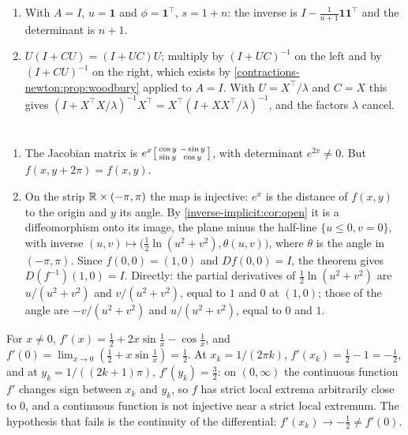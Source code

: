 \begin{enumerate}[nosep]
  \item With $A = I$, $u = \mathbf 1$ and $\phi = \mathbf 1^\top$,
        $s = 1 + n$: the inverse is
        $I - \frac1{n + 1}\mathbf 1\mathbf 1^\top$ and the determinant
        is $n + 1$.
  \item $U(I + CU) = (I + UC)U$; multiply by $(I + UC)^{-1}$ on the
        left and by $(I + CU)^{-1}$ on the right, which exists by
        \cref{contractions-newton:prop:woodbury} applied to $A = I$.
        With $U = X^\top/\lambda$ and $C = X$ this gives
        $(I + X^\top X/\lambda)^{-1}X^\top
        = X^\top(I + XX^\top/\lambda)^{-1}$, and the factors $\lambda$
        cancel.
\end{enumerate}

\section{}

\begin{enumerate}[nosep]
  \item The Jacobian matrix is
        $e^x\begin{bsmallmatrix}\cos y & -\sin y\\\sin y & \cos y
        \end{bsmallmatrix}$, with determinant $e^{2x}\neq0$. But
        $f(x, y + 2\pi) = f(x, y)$.
  \item On the strip $\mathbb{R}\times(-\pi, \pi)$ the map is injective: $e^x$
        is the distance of $f(x, y)$ to the origin and $y$ its angle. By
        \cref{inverse-implicit:cor:open} it is a diffeomorphism onto its
        image, the plane minus the half-line $\{u\leq0, v = 0\}$, with
        inverse
        $(u, v)\mapsto\bigl(\frac12\ln(u^2 + v^2), \theta(u, v)\bigr)$,
        where $\theta$ is the angle in $(-\pi, \pi)$. Since
        $f(0, 0) = (1, 0)$ and $Df(0, 0) = I$, the theorem gives
        $D(f^{-1})(1, 0) = I$. Directly: the partial derivatives of
        $\frac12\ln(u^2 + v^2)$ are $u/(u^2 + v^2)$ and $v/(u^2 + v^2)$,
        equal to $1$ and $0$ at $(1, 0)$; those of the angle are
        $-v/(u^2 + v^2)$ and $u/(u^2 + v^2)$, equal to $0$ and $1$.
\end{enumerate}

For $x\neq0$, $f'(x) = \frac12 + 2x\sin\frac1x - \cos\frac1x$, and
$f'(0) = \lim_{x\to0}(\frac12 + x\sin\frac1x) = \frac12$. At
$x_k = 1/(2\pi k)$, $f'(x_k) = \frac12 - 1 = -\frac12$, and at
$y_k = 1/((2k + 1)\pi)$, $f'(y_k) = \frac32$: on $(0, \infty)$ the
continuous function $f'$ changes sign between $x_k$ and $y_k$, so $f$ has
strict local extrema arbitrarily close to $0$, and a continuous function
is not injective near a strict local extremum. The hypothesis that fails
is the continuity of the differential: $f'(x_k)\to-\frac12\neq f'(0)$.

